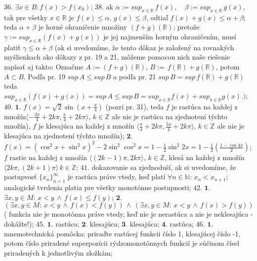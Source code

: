 $\boxed{36.}$
$\exists x \in B: f(x) > f(x_{0})$;
$\boxed{38.}$
ak $ \alpha:= sup_{x \in \mathbb{R}} \, f(x), \quad \beta :=sup_{x \in \mathbb{R}} \, g(x) $, tak pre všetky $ x \in \mathbb{R} $ je $ f(x) \leq \alpha $, $ g(x) \leq \beta $, odtiaľ $ f(x)+g(x) \leq \alpha + \beta $; teda $ \alpha + \beta $ je horné ohraničenie množiny $ (f+g)(\mathbb{R}) $; pretože $ \gamma := sup_{x \in \mathbb{R}}  (f(x)+g(x))$ je jej najmenším horným ohraničením, musí platiť  $ \gamma\leq\alpha+\beta $ (ak si uvedomíme, že tento dôkaz je založený na rovnakých myšlienkach ako dôkazy z pr. 19 a 21, môžeme pomocou nich naše riešenie zapísať aj takto: Označme $ A := (f+g)(\mathbb{R}), \, B:= \, f(\mathbb{R})+g(\mathbb{R}) $, potom $ A \subset B $. Podľa pr. 19 $ sup \, A \leq sup \, B $ a podľa pr. 21 $ sup \, B  = sup \, f( \mathbb{R}) + g( \mathbb{R}) $ teda $ sup_{x \in \mathbb{R}} (f(x)+g(x)) = sup \,A \leq  sup \,B =  sup_{x \in \mathbb{R}}f (x) +  sup_{\pi \in \mathbb{R}} g(x).) $;
$\boxed{40.}$
$\boldsymbol{1.}$
$ f(x)= \sqrt{2}\sin (x+\frac{x}{4}) $ (pozri pr. 31), teda $ f $ je rastúca na každej z  množín$ \langle -\frac{3 \pi}{4}+2k \pi, \frac{\pi}{4}+2k \pi \rangle ,\, k \in \mathbb{Z} $ ale nie je rastúca na zjednotení týchto množín), $ f $ je klesajúca na každej z  množín $ \langle \frac{ \pi}{4}+2k \pi, \frac{5 \pi}{4}+2k \pi \rangle ,\, k \in \mathbb{Z} $  ale nie je klesajúca na zjednotení týchto množín);
$\boldsymbol{2.}$
$ f(x) =( \cos^{2} x+ \sin^{2} x) ^{2} -2 \sin^{2} \cos^{2} x = 1- \frac{1}{2} \sin^{2} 2x = 1- \frac{1}{2}( \frac{1- \cos 4x}{2}) $; $ f $ rastie na každej z množín $ \langle (2k-1) \pi, 2k \pi\rangle , \, k\in \mathbb{Z} $, klesá  na každej z množín $ \langle 2k \pi, (2k+1) \pi \rangle   \, k\in \mathbb{Z} $;
$\boxed{41.}$
dokazovanie sa zjednoduší, ak si uvedomíme, že postupvosť $ \lbrace x_{n}\rbrace_{n=1}^\infty $  je rastúca práve vtedy, keď platí $ \forall n \in \mathbb{N}: \, x_{n}< x_{n+1} $; analogické tvrdenia platia pre všetky monotónne postupnosti;
$\boxed{42.}$
$\boldsymbol{1.}$
$ \exists x,y \in M: \, x<y \, \land \, f(x)\leq f(y) $;
$\boldsymbol{2.}$
$( \exists x,y \in M: \, x<y \, \land \, f(x)<f(y)) \,\land \, ( \exists x,y \in M: \, x<y \, \land \, f(x)>f(y))  $ ( funkcia nie je monotónna práve vtedy, keď nie je nerastúca a nie je neklesajúca - dokážte!);
$\boxed{45.}$
$\boldsymbol{1.}$
rastúca;
$\boldsymbol{2.}$
klesajúca;
$\boldsymbol{3.}$
klesajúca;
$\boldsymbol{4.}$
rastúca;
$\boxed{46.}$
$\boldsymbol{1.}$
mnemotechnická pomôcka: priraďte rastúcej funkcii číslo 1, klesajúcej číslo -1, potom číslo priradené superpozícii rýdzomonotónnych funkcií je súčinom čísel priradených k jednotlivým zložkám; 
